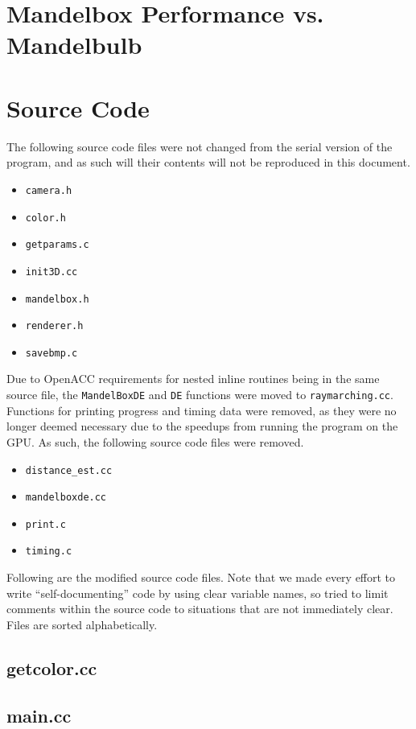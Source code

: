 \documentclass[11pt]{article}
\begin{document}
\section{Mandelbox Performance vs. Mandelbulb}

\section{Source Code}
The following source code files were not changed from the serial version of the program, and as such will their contents will not be reproduced in this document.
\begin{itemize}
\item \texttt{camera.h}
\item \texttt{color.h}
\item \texttt{getparams.c}
\item \texttt{init3D.cc}
\item \texttt{mandelbox.h}
\item \texttt{renderer.h}
\item \texttt{savebmp.c}
\end{itemize}

Due to OpenACC requirements for nested inline routines being in the same source file, the \texttt{MandelBoxDE} and \texttt{DE} functions were moved to \texttt{raymarching.cc}. Functions for printing progress and timing data were removed, as they were no longer deemed necessary due to the speedups from running the program on the GPU. As such, the following source code files were removed.
\begin{itemize}
\item \texttt{distance\_est.cc}
\item \texttt{mandelboxde.cc}
\item \texttt{print.c}
\item \texttt{timing.c}
\end{itemize}

Following are the modified source code files. Note that we made every effort to write ``self-documenting'' code by using clear variable names, so tried to limit comments within the source code to situations that are not immediately clear. Files are sorted alphabetically.

\subsection{getcolor.cc}


\subsection{main.cc}

\end{document}
